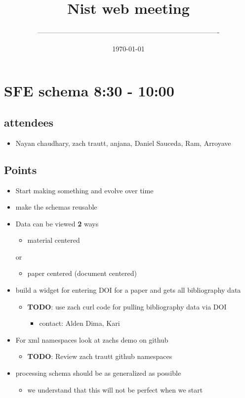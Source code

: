 \documentclass[11pt]{article}
\author{-------------------------------------------------------------------------------}
\date{\today}
\title{Nist web meeting}
\begin{document}
\maketitle
\tableofcontents


\section{SFE schema 8:30 - 10:00}
\label{sec:orgheadline3}
\subsection{attendees}
\label{sec:orgheadline1}
\begin{itemize}
\item Nayan chaudhary, zach trautt, anjana, Daniel Sauceda, Ram, Arroyave
\end{itemize}
\subsection{Points}
\label{sec:orgheadline2}
\begin{itemize}
\item Start making something and evolve over time
\item make the schemas reusable
\item Data can be viewed \textbf{2} ways
\begin{itemize}
\item material centered
\end{itemize}
or
\begin{itemize}
\item paper centered (document centered)
\end{itemize}
\item build a widget for entering DOI for a paper and gets all bibliography data
\begin{itemize}
\item \textbf{TODO}: use zach curl code for pulling bibliography data via DOI
\begin{itemize}
\item contact: Alden Dima, Kari
\end{itemize}
\end{itemize}
\item For xml namespaces look at zachs demo on github
\begin{itemize}
\item \textbf{TODO}: Review zach trautt github namespaces
\end{itemize}
\item processing schema should be as generalized as possible
\begin{itemize}
\item we understand that this will not be perfect when we start
\end{itemize}
\end{itemize}
\end{document}
